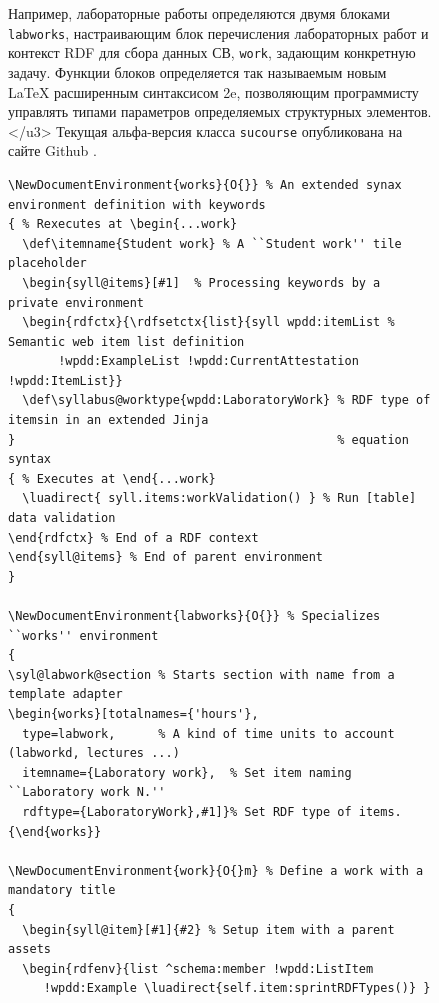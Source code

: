 \documentclass[ 

]{aiitart}
\begin{document}
\begin{figure}

Например, лабораторные работы определяются двумя блоками \verb|labworks|, настраивающим блок перечисления лабораторных работ и контекст RDF для сбора данных СВ, \verb|work|, задающим конкретную задачу. Функции блоков определяется так называемым новым \LaTeX{} расширенным синтаксисом \LaTex2e, позволяющим программисту управлять типами параметров определяемых структурных элементов.</u3> Текущая альфа-версия класса \verb|sucourse| опубликована на сайте Github \cite{ghs}. 

\begin{verbatim}
\NewDocumentEnvironment{works}{O{}} % An extended synax environment definition with keywords
{ % Rexecutes at \begin{...work}
  \def\itemname{Student work} % A ``Student work'' tile placeholder
  \begin{syll@items}[#1]  % Processing keywords by a private environment
  \begin{rdfctx}{\rdfsetctx{list}{syll wpdd:itemList % Semantic web item list definition
       !wpdd:ExampleList !wpdd:CurrentAttestation !wpdd:ItemList}}
  \def\syllabus@worktype{wpdd:LaboratoryWork} % RDF type of itemsin in an extended Jinja
}                                             % equation syntax
{ % Executes at \end{...work}
  \luadirect{ syll.items:workValidation() } % Run [table] data validation
\end{rdfctx} % End of a RDF context
\end{syll@items} % End of parent environment
}

\NewDocumentEnvironment{labworks}{O{}} % Specializes ``works'' environment
{
\syl@labwork@section % Starts section with name from a template adapter
\begin{works}[totalnames={'hours'},
  type=labwork,      % A kind of time units to account (labworkd, lectures ...)
  itemname={Laboratory work},  % Set item naming ``Laboratory work N.''
  rdftype={LaboratoryWork},#1]}% Set RDF type of items.
{\end{works}}

\NewDocumentEnvironment{work}{O{}m} % Define a work with a mandatory title
{
  \begin{syll@item}[#1]{#2} % Setup item with a parent assets
  \begin{rdfenv}{list ^schema:member !wpdd:ListItem
     !wpdd:Example \luadirect{self.item:sprintRDFTypes()} }

\end{verbatim}
\end{figure}
\end{document}
